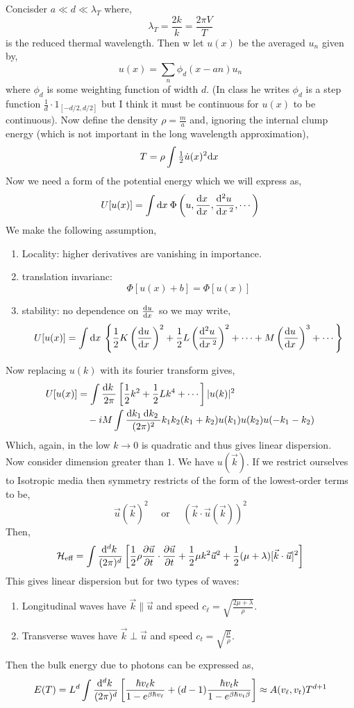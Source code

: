 \documentclass[12pt]{article}
\renewcommand{\H}{\mathcal{H}}
\begin{document}
Concisder $a \ll d \ll \lambda_T$ where,
\[ \lambda_T = \frac{2 k}{k} = \frac{2 \pi V}{T} \]
is the reduced thermal wavelength. Then w let $u(x)$ be the averaged $u_n$ given by,
\[ u(x) = \sum_{n} \phi_d(x - an) u_n \]
where $\phi_d$ is some weighting function of width $d$. (In class he writes $\phi_d$ is a step function $\frac{1}{d} \cdot 1_{[-d/2, d/2]}$ but I think it must be continuous for $u(x)$ to be continuous). Now define the density $\rho = \frac{m}{a}$ and, ignoring the internal clump energy (which is not important in the long wavelength approximation),
\[ T = \rho \int \tfrac{1}{2} \dot{u}(x)^2 \mathrm{d}x \: \]
Now we need a form of the potential energy which we will express as,
\[ U[u(x)] = \int \mathrm{d}x \: \Phi \left( u, \frac{\mathrm{d}x \:}{\mathrm{d}x \:}, \frac{\mathrm{d}^{2} u \:}{\mathrm{d}x \:^{2}}, \cdots \right) \]
We make the following assumption,
\begin{enumerate}
\item Locality: higher derivatives are vanishing in importance.
\item translation invarianc:
\[ \Phi[u(x) + b] = \Phi[u(x)] \]
\item stability: no dependence on $\frac{\mathrm{d}u \:}{\mathrm{d}x \:}$ so we may write,
\[ U[u(x)] = \int \mathrm{d}x \: \left \{ \frac{1}{2} K \left( \frac{\mathrm{d}u \:}{\mathrm{d}x \:} \right)^2 + \frac{1}{2} L \left( \frac{\mathrm{d}^{2} u \:}{\mathrm{d}x \:^{2}} \right)^2 + \cdots + M \left( \frac{\mathrm{d}u \:}{\mathrm{d}x \:} \right)^3 + \cdots \right\} \]
\end{enumerate}
Now replacing $u(k)$ with its fourier transform gives,
\begin{align*}
U[u(x)] & = \int \frac{\mathrm{d}k \:}{2 \pi} \left[ \frac{1}{2} k^2 + \frac{1}{2} L k^4 + \cdots \right] |u(k)|^2
\\
& \quad - i M \int \frac{\mathrm{d}k_1 \: \mathrm{d}k_2 \:}{(2 \pi)^2} k_1 k_2 (k_1 + k_2) u(k_1) u(k_2) u(-k_1 - k_2) 
\end{align*}
Which, again, in the low $k \to 0$ is quadratic and thus gives linear dispersion. 
\bigskip\\
Now consider dimension greater than $1$. We have $u(\vec{k})$. If we restrict ourselves to Isotropic media then symmetry restricts of the form of the lowest-order terms to be,
\[ \vec{u}(\vec{k})^2 \quad \text{ or } \quad (\vec{k} \cdot \vec{u}(\vec{k}) )^2 \]
Then,
\[ \H_{\text{eff}} = \int \frac{\dn{d}{k}}{(2 \pi)^d} \left[ \frac{1}{2} \rho \pderiv{\vec{u}}{t} \cdot \pderiv{\vec{u}}{t} + \frac{1}{2} \mu k^2 \vec{u}^2 + \frac{1}{2} (\mu + \lambda) [\vec{k} \cdot \vec{u} ]^2 \right] \]
This gives linear dispersion but for two types of waves:
\begin{enumerate}
\item Longitudinal waves have $\vec{k} \parallel \vec{u}$ and speed $c_\ell = \sqrt{\frac{2 \mu + \lambda}{\rho}}$.
\item Transverse waves have $\vec{k} \perp \vec{u}$ and speed $c_t = \sqrt{\frac{\mu}{\rho}}$. 
\end{enumerate}
Then the bulk energy due to photons can be expressed as,
\[ E(T) = L^d \int \frac{\mathrm{d}^{d} k \:}{(2 \pi)^d} \left[ \frac{\hbar v_\ell k}{1 - e^{\beta \hbar v_\ell}} + (d - 1) \frac{\hbar v_t k}{1 - e^{\beta \hbar v_t \beta}} \right] \approx A(v_\ell, v_t) T^{d + 1} \]
\end{document}
